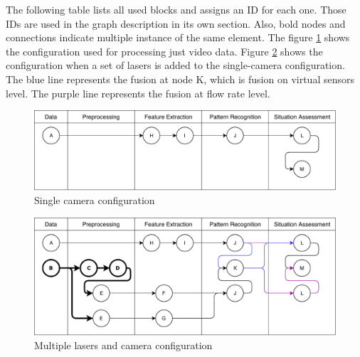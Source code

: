 The following table lists all used blocks and assigns an ID for each one. Those IDs are used in the graph description in its own section. Also, bold nodes and connections indicate multiple instance of the same element. The figure \ref{tconf1} shows the  configuration used for processing just video data. Figure \ref{tconf2} shows the configuration when a set of lasers is added to the single-camera configuration. The blue line represents the fusion at node K, which is fusion on virtual sensors level. The purple line represents the fusion at flow rate level.

\begin{figure}[ht!]
\centering
\includegraphics[scale=0.6]{fig/4/test_configuration1.pdf}
\caption{Single camera configuration}
\label{tconf1}
\end{figure}

\begin{figure}[ht!]
\centering
\includegraphics[scale=0.6]{fig/4/test_configuration2.pdf}
\caption{Multiple lasers and camera configuration}
\label{tconf2}
\end{figure}


%


